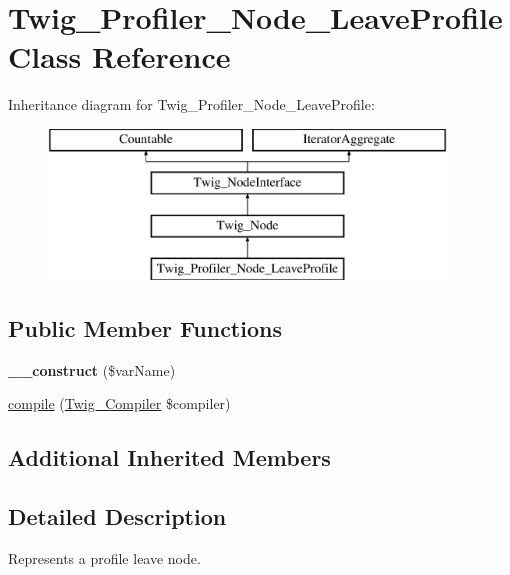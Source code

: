 \hypertarget{classTwig__Profiler__Node__LeaveProfile}{}\section{Twig\+\_\+\+Profiler\+\_\+\+Node\+\_\+\+Leave\+Profile Class Reference}
\label{classTwig__Profiler__Node__LeaveProfile}
Inheritance diagram for Twig\+\_\+\+Profiler\+\_\+\+Node\+\_\+\+Leave\+Profile\+:\begin{figure}[H]
\begin{center}
\leavevmode
\includegraphics[height=4.000000cm]{classTwig__Profiler__Node__LeaveProfile}
\end{center}
\end{figure}
\subsection*{Public Member Functions}
\begin{DoxyCompactItemize}
\item 
{\bfseries \+\_\+\+\_\+construct} (\$var\+Name)\hypertarget{classTwig__Profiler__Node__LeaveProfile_a00d51848a12b7172b0f41978c354d0f3}{}\label{classTwig__Profiler__Node__LeaveProfile_a00d51848a12b7172b0f41978c354d0f3}

\item 
\hyperlink{classTwig__Profiler__Node__LeaveProfile_aafc26d7d88bf6e7b8c8e2552827c722c}{compile} (\hyperlink{classTwig__Compiler}{Twig\+\_\+\+Compiler} \$compiler)
\end{DoxyCompactItemize}
\subsection*{Additional Inherited Members}


\subsection{Detailed Description}
Represents a profile leave node.

